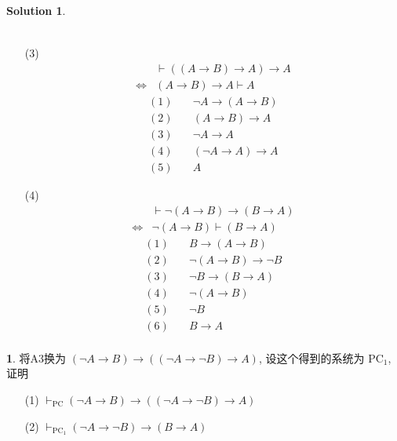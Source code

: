 \documentclass[a4paper, 12pt]{ctexart} %
\theoremstyle{plain}
\theoremstyle{definition}
\newtheorem{num}{}
\newtheorem*{solution}{Solution}
\theoremstyle{remark}
\begin{document}
\begin{solution}
\begin{enumerate}
\begin{align*}
        \end{align*}
        \item[(3)]
        \begin{align*}
            &\vdash \left( \left(A \to B \right) \to A  \right) \to  A \\
            \Leftrightarrow & \left(A \to B \right) \to A  \vdash A 
        \end{align*}
        \begin{align*}
            (1)\quad&\neg A \to \left(A \to B \right) \tag{thm 6} \\
            (2)\quad&\left(A \to B \right) \to A \tag{已知} \\
            (3)\quad&\neg A \to A \tag{(1),(2),thm 8}\\
            (4)\quad&\left(\neg A \to A \right) \to A \tag{反证法}\\
            (5)\quad&A \tag{(3),(4),rmp}
        \end{align*}
        \item[(4)]
        \begin{align*}
            & \vdash \neg \left(A\to B \right) \to \left(B \to A \right) \\
            \Leftrightarrow & \neg \left(A \to B \right) \vdash \left(B \to A \right)
        \end{align*}
        \begin{align*}
            (1) \quad&B \to \left(A \to B \right) \tag{A1}\\
            (2) \quad&\neg \left(A \to B \right) \to \neg  B\tag{逆否}\\
            (3) \quad&\neg B \to \left(B \to A\right) \tag{thm 6}\\
            (4) \quad&\neg \left(A \to B \right) \tag{已知} \\
            (5) \quad&\neg B \tag{(2),rmp}\\
            (6) \quad&B\to A \tag{(3),rmp}\\
        \end{align*}
    \end{enumerate}
\end{solution}
\begin{num}
    将A3换为 $\left(\neg A \to B\right) \to \left(\left(\neg A \to \neg B \right) \to A\right)$, 设这个得到的系统为 $\text{PC}_{1}$, 证明 
    \begin{enumerate}
        \item[(1)] $\vdash _{\text{PC}} \left(\neg A \to B \right) \to \left(\left( \neg A \to \neg B\right) \to A\right)$
        \item[(2)] $\vdash _{\text{PC}_{1}} \left(\neg A \to \neg B\right) \to \left( B \to A \right)$ 
    \end{enumerate}
\end{num}
\end{document}
